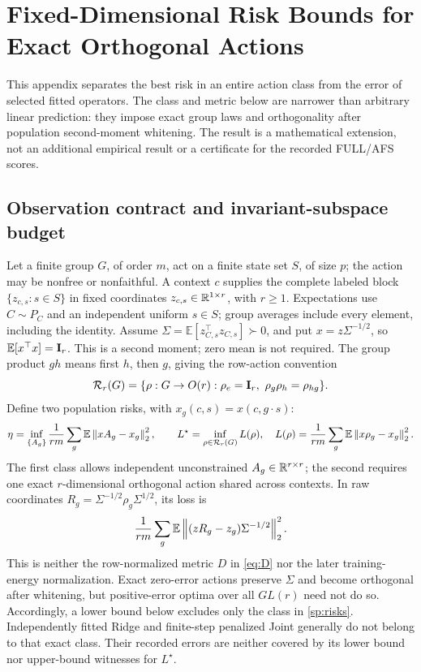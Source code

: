 \section{Fixed-Dimensional Risk Bounds for Exact Orthogonal Actions}
\label{app:spectral-risk}

This appendix separates the best risk in an entire action class from the error of selected fitted operators. The class and metric below are narrower than arbitrary linear prediction: they impose exact group laws and orthogonality after population second-moment whitening. The result is a mathematical extension, not an additional empirical result or a certificate for the recorded FULL/AFS scores.

\subsection{Observation contract and invariant-subspace budget}
\label{sp:setup}
Let a finite group $G$, of order $m$, act on a finite state set $S$, of size $p$; the action may be nonfree or nonfaithful. A context $c$ supplies the complete labeled block $\{z_{c,s}:s\in S\}$ in fixed coordinates $z_{c,s}\in\mathbb{R}^{1\times r}$, with $r\ge1$. Expectations use $C\sim P_C$ and an independent uniform $s\in S$; group averages include every element, including the identity. Assume $\Sigma=\mathbb E[z_{C,s}^{\top}z_{C,s}]\succ0$, and put $x=z\Sigma^{-1/2}$, so $\mathbb E[x^{\top}x]=\mathbf{I}_r$. This is a second moment; zero mean is not required. The group product $gh$ means first $h$, then $g$, giving the row-action convention
\[
 \mathcal R_r(G)=\{\rho:G\to O(r):\rho_e=\Id_r,\ \rho_g\rho_h=\rho_{hg}\}.
\]
Define two population risks, with $x_g(c,s)=x(c,g\cdot s)$:
\begin{equation}
 \eta=\inf_{\{A_g\}}\frac1{rm}\sum_g\mathbb E\left\lVert xA_g-x_g\right\rVert_2^2,
 \qquad L^\star=\inf_{\rho\in\mathcal R_r(G)}L(\rho),\quad
 L(\rho)=\frac1{rm}\sum_g\mathbb E\left\lVert x\rho_g-x_g\right\rVert_2^2.
 \label{sp:risks}
\end{equation}
The first class allows independent unconstrained $A_g\in\mathbb{R}^{r\times r}$; the second requires one exact $r$-dimensional orthogonal action shared across contexts. In raw coordinates $R_g=\Sigma^{-1/2}\rho_g\Sigma^{1/2}$, its loss is
\[
 \frac1{rm}\sum_g\mathbb E\left\lVert (zR_g-z_g)\Sigma^{-1/2}\right\rVert_2^2.
\]
This is neither the row-normalized metric $D$ in \cref{eq:D} nor the later training-energy normalization. Exact zero-error actions preserve $\Sigma$ and become orthogonal after whitening, but positive-error optima over all $GL(r)$ need not do so. Accordingly, a lower bound below excludes only the class in \cref{sp:risks}. Independently fitted Ridge and finite-step penalized Joint generally do not belong to that exact class. Their recorded errors are neither covered by its lower bound nor upper-bound witnesses for $L^\star$.

